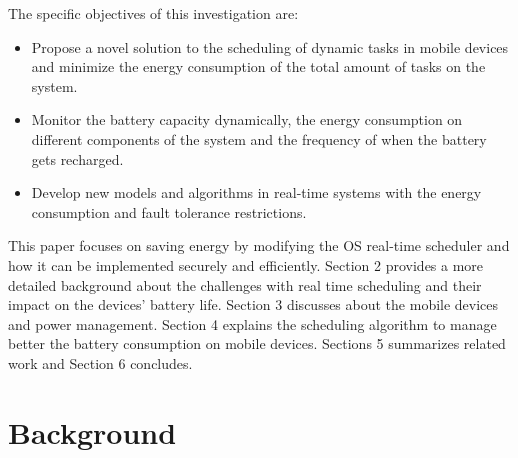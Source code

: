 \documentclass[conference]{IEEEtran}
\begin{document}
The specific objectives of this investigation are:
\begin{itemize}
\item Propose a novel solution to the scheduling of dynamic tasks in mobile devices and minimize the energy consumption of the total amount of tasks on the system.
\item Monitor the battery capacity dynamically, the energy consumption on different components of the system and the frequency of when the battery gets recharged.
\item Develop new models and algorithms in real-time systems with the energy consumption and fault tolerance restrictions.
\end{itemize}


This paper focuses on saving energy by modifying the OS real-time scheduler and how it can be implemented securely and efficiently. 
Section 2 provides a more detailed background about the challenges with real time scheduling and their impact on the devices' battery life. Section 3 discusses about the mobile devices and power management. Section 4 explains the scheduling algorithm to manage better the battery consumption on mobile devices. Sections 5 summarizes related work and Section 6 concludes.

\section{Background}
\end{document}
